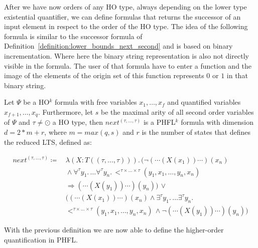 After we have now orders of any HO type, always depending on the lower type existential quantifier, we can define
formulas that returns the successor of an input element in respect to the order of the HO type. The idea of the
following formula is similar to the successor formula of Definition~\ref{definition:lower_bounds_next_second} and is
based on binary incrementation. Where here the binary string representation is also not directly visible in the
formula. The user of that formula have to enter a function and the image of the elements of the origin set of this
function represents $0$ or $1$ in that binary string.

\begin{definition}
    \label{definition:lower_bounds_next_higher}
    Let $\Psi$ be a HO$^k$ formula with free variables $x_1, \dots, x_f$ and quantified variables $x_{f+1}, \dots,
    x_q$. Furthermore, let $s$ be the maximal arity of all second order variables of $\Psi$ and $\tau \neq \odot$ a
    HO type, then $next^{(\tau, \dots, \tau)}$ is a PHFL$^k$ formula with dimension $d = 2 * m + r$, where $m = max({q,
    s})$ and $r$ is the number of states that defines the reduced LTS, defined as:

    \begin{align*}
        next^{(\tau, \dots, \tau)} \coloneqq &\,\lambda (X \colon T ((\tau, \dots, \tau))).\,(\neg (\dotsb(X
        (x_1))\dotsb) (x_n) \\&\, \wedge \forall^{\tau}y_1.\, \dots \forall^{\tau}y_n.\,<^{\tau \times
        \dots \times \tau}(y_1, x_1, \dots, y_n, x_n) \\&\,\Rightarrow  (\dotsb(X(y_1))\dotsb)(y_n)) \,\vee
        \\&\,((\dotsb (X(x_1)) \dotsb)(x_n) \wedge \exists^{\tau}y_1.\, \dots \exists^{\tau}y_n.\, \\&\,
        <^{\tau \times \dots \times \tau}
        (y_1, x_1, \dots, y_n, x_n)\,\wedge \neg (\dotsb(X(y_1))\dotsb)(y_n))
    \end{align*}
\end{definition}

With the previous definition we are now able to define the higher-order quantification in PHFL.

